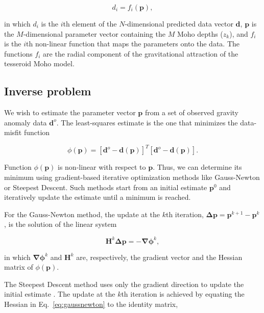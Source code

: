 \documentclass[extra,mreferee]{gji}
\begin{document}
\begin{equation}
    d_i = f_i(\mathbf{p}),
\end{equation}

\noindent in which $d_i$ is the $i$th element of the $N$-dimensional predicted
data vector $\mathbf{d}$, $\mathbf{p}$ is the $M$-dimensional parameter vector
containing the $M$ Moho depths ($z_k$),
and $f_i$ is the $i$th non-linear function that maps the parameters onto the
data.
The functions $f_i$ are the radial component of the gravitational attraction
of the tesseroid Moho model.



\subsection{Inverse problem}

We wish to estimate the parameter vector $\mathbf{p}$ from a set of observed
gravity anomaly data $\mathbf{d}^o$.
The least-squares estimate is the one that minimizes the data-misfit function

\begin{equation}
    \phi(\mathbf{p}) =
    [\mathbf{d}^o - \mathbf{d}(\mathbf{p})]^T[\mathbf{d}^o - \mathbf{d}(\mathbf{p})].
    \label{eq:data-misfit}
\end{equation}

Function $\phi(\mathbf{p})$ is non-linear with respect to $\mathbf{p}$.
Thus, we can determine its minimum using gradient-based
iterative optimization
methods like Gauss-Newton or Steepest Descent.
Such methods start from an initial estimate $\mathbf{p}^0$ and iteratively
update the estimate until a minimum is reached.

For the Gauss-Newton method,
the update at the $k$th iteration,
$\mathbf{\Delta p} = \mathbf{p}^{k+1} - \mathbf{p}^k$,
is the solution of the linear system

\begin{equation}
    \mathbf{H}^k\mathbf{\Delta p} = -\mathbf{\nabla\phi}^k,
    \label{eq:gaussnewton}
\end{equation}

\noindent in which
$\mathbf{\nabla\phi}^k$ and $\mathbf{H}^k$ are, respectively,
the gradient vector and the Hessian matrix of $\phi(\mathbf{p})$.

The Steepest Descent method uses only the gradient direction
to update the initial estimate \citep{kelley1987}.
The update at the $k$th iteration is achieved by equating the Hessian
in Eq.~\ref{eq:gaussnewton} to the identity matrix,
\end{document}
